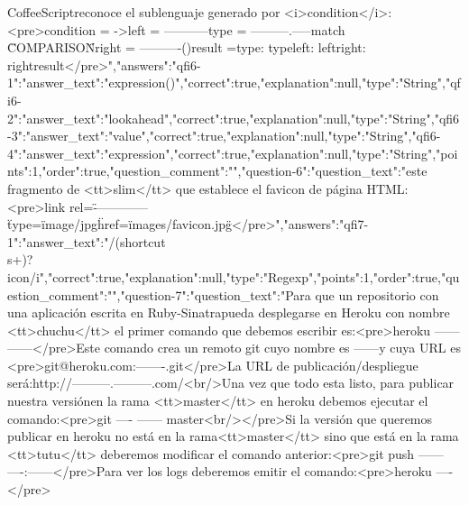 \begin{rawhtml}
{CoffeeScript\nque reconoce el sublenguaje generado por <i>condition</i>:\n  <pre>\n  condition = ->\n    left = -----------\n    type = ---------.-----\n    match \"COMPARISON\"\n    right = ----------()\n    result =\n      type: type\n      left: left\n      right: right\n    result\n  </pre>\n","answers":{"qfi6-1":{"answer_text":"expression()","correct":true,"explanation":null,"type":"String"},"qfi6-2":{"answer_text":"lookahead","correct":true,"explanation":null,"type":"String"},"qfi6-3":{"answer_text":"value","correct":true,"explanation":null,"type":"String"},"qfi6-4":{"answer_text":"expression","correct":true,"explanation":null,"type":"String"}},"points":1,"order":true,"question_comment":""},"question-6":{"question_text":"\nComplete este fragmento de <tt>slim</tt> que establece el favicon de \nla página HTML:\n<pre>\n    link rel=\"-------------\" type=\"image/jpg\" href=\"images/favicon.jpg\"\n</pre>","answers":{"qfi7-1":{"answer_text":"/(shortcut\\s+)?icon/i","correct":true,"explanation":null,"type":"Regexp"}},"points":1,"order":true,"question_comment":""},"question-7":{"question_text":"\n      Para que un repositorio con una aplicación escrita en Ruby-Sinatra\n      pueda desplegarse en Heroku con nombre <tt>chuchu</tt> el primer comando   que debemos escribir es:\n      <pre>\n      heroku ------ ------\n      </pre>\n      Este comando crea un remoto git cuyo nombre es ------\n      y cuya URL es \n      <pre>\n        git@heroku.com:-------.git\n      </pre>\n      La URL de publicación/despliegue será:\n      http://---------.---------.com/\n      <br/>\n      Una vez que todo esta listo, para publicar nuestra versión\n      en la rama <tt>master</tt> en heroku debemos ejecutar el comando:\n      <pre>\n      git ---- ------ master\n      <br/>\n      </pre>\n      Si la versión que queremos publicar en heroku no está en la rama\n      <tt>master</tt> sino que está en la rama <tt>tutu</tt> deberemos \n      modificar el comando anterior:\n      <pre>\n      git push ------ ----:------\n      </pre>\n      Para ver los logs deberemos emitir el comando:\n      <pre>\n       heroku ----\n      </pre>\n    }
\end{rawhtml}

